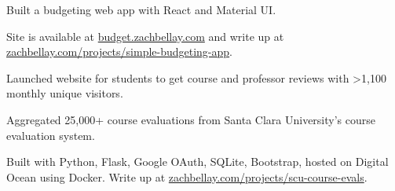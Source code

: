 \documentclass[]{deedy-resume-openfont}
\begin{document}


\hfill{}

\begin{tightemize}
\item Built a budgeting web app with React and Material UI.
\item Site is available at \href{https://budget.zachbellay.com}{budget.zachbellay.com} and write up at \href{https://zachbellay.com/projects/simple-budgeting-app}{zachbellay.com/projects/simple-budgeting-app}.
\end{tightemize}
\sectionsep

\hfill{}

\begin{tightemize}
\item Launched website for students to get course and professor reviews with >1,100 monthly unique visitors.
\item Aggregated 25,000+ course evaluations from Santa Clara University's course evaluation system.
\item Built with Python, Flask, Google OAuth, SQLite, Bootstrap, hosted on Digital Ocean using Docker. Write up at \href{https://zachbellay.com/projects/scu-course-evals}{zachbellay.com/projects/scu-course-evals}.
\end{tightemize}

\end{document}
